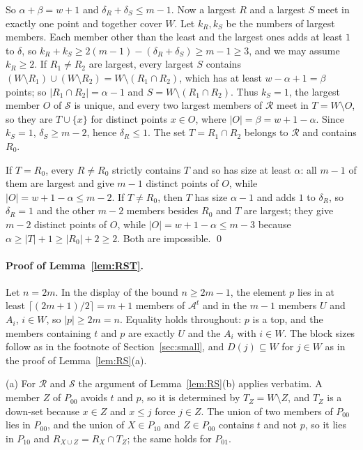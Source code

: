 \documentclass[12pt]{article}
\theoremstyle{plain}
\newcommand{\cA}{\mathcal{A}}
\begin{document}
So $\alpha+\beta=w+1$ and $\delta_R+\delta_S\le m-1$. Now a largest $R$ and a largest $S$ meet in exactly one point and together cover $W$. Let $k_R,k_S$ be the numbers of largest members. Each member other than the least and the largest ones adds at least $1$ to $\delta$, so $k_R+k_S\ge 2(m-1)-(\delta_R+\delta_S)\ge m-1\ge3$, and we may assume $k_R\ge2$. If $R_1\ne R_2$ are largest, every largest $S$ contains $(W\setminus R_1)\cup(W\setminus R_2)=W\setminus(R_1\cap R_2)$, which has at least $w-\alpha+1=\beta$ points; so $|R_1\cap R_2|=\alpha-1$ and $S=W\setminus(R_1\cap R_2)$. Thus $k_S=1$, the largest member $O$ of $\mathcal S$ is unique, and every two largest members of $\mathcal R$ meet in $T=W\setminus O$, so they are $T\cup\{x\}$ for distinct points $x\in O$, where $|O|=\beta=w+1-\alpha$. Since $k_S=1$, $\delta_S\ge m-2$, hence $\delta_R\le1$. The set $T=R_1\cap R_2$ belongs to $\mathcal R$ and contains $R_0$.

If $T=R_0$, every $R\neq R_0$ strictly contains $T$ and so has size at least $\alpha$: all $m-1$ of them are largest and give $m-1$ distinct points of $O$, while $|O|=w+1-\alpha\le m-2$. If $T\ne R_0$, then $T$ has size $\alpha-1$ and adds $1$ to $\delta_R$, so $\delta_R=1$ and the other $m-2$ members besides $R_0$ and $T$ are largest; they give $m-2$ distinct points of $O$, while $|O|=w+1-\alpha\le m-3$ because $\alpha\ge|T|+1\ge|R_0|+2\ge2$. Both are impossible. \qed

\paragraph*{Proof of Lemma~\ref{lem:RST}.} Let $n=2m$. In the display of the bound $n\ge2m-1$, the element $p$ lies in at least $\lceil(2m+1)/2\rceil=m+1$ members of $\cA^t$ and in the $m-1$ members $U$ and $A_i$, $i\in W$, so $|p|\ge 2m=n$. Equality holds throughout: $p$ is a top, and the members containing $t$ and $p$ are exactly $U$ and the $A_i$ with $i\in W$. The block sizes follow as in the footnote of Section~\ref{sec:small}, and $D(j)\subseteq W$ for $j\in W$ as in the proof of Lemma~\ref{lem:RS}(a).

(a) For $\mathcal R$ and $\mathcal S$ the argument of Lemma~\ref{lem:RS}(b) applies verbatim. A member $Z$ of $P_{00}$ avoids $t$ and $p$, so it is determined by $T_Z=W\setminus Z$, and $T_Z$ is a down-set because $x\in Z$ and $x\le j$ force $j\in Z$. The union of two members of $P_{00}$ lies in $P_{00}$, and the union of $X\in P_{10}$ and $Z\in P_{00}$ contains $t$ and not $p$, so it lies in $P_{10}$ and $R_{X\cup Z}=R_X\cap T_Z$; the same holds for $P_{01}$.
\end{document}
